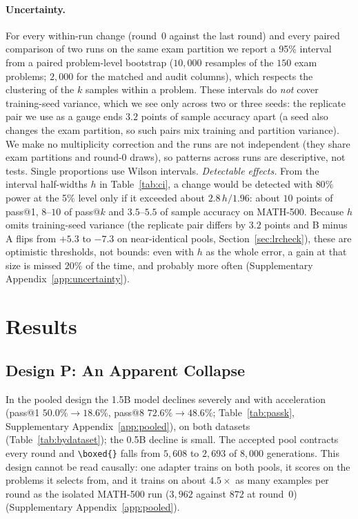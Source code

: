 \documentclass[runningheads]{llncs}
\begin{document}
\paragraph{Uncertainty.} For every within-run change (round~0 against the last
round) and every paired comparison of two runs on the same exam partition we
report a 95\% interval from a paired problem-level bootstrap ($10{,}000$
resamples of the $150$ exam problems; $2{,}000$ for the matched and audit columns), which respects the clustering of the $k$
samples within a problem. These intervals do \emph{not} cover training-seed
variance, which we see only across two or three seeds: the replicate
pair we use as a gauge ends $3.2$ points of sample accuracy apart (a seed also changes the exam
partition, so such pairs mix training and partition variance). We make no multiplicity correction and the runs are not independent (they share
exam partitions and round-0 draws), so patterns across runs are descriptive, not tests. Single proportions use Wilson
intervals. \emph{Detectable effects.} From the interval half-widths $h$ in
Table~\ref{tab:ci}, a change would be detected with $80\%$ power at the 5\%
level only if it exceeded about $2.8\,h/1.96$: about $10$ points of pass@1,
$8$--$10$ of pass@$k$ and $3.5$--$5.5$ of sample accuracy on MATH-500. Because
$h$ omits training-seed variance (the replicate pair differs by $3.2$ points and
B minus A flips from $+5.3$ to $-7.3$ on near-identical pools,
Section~\ref{sec:lrcheck}), these are optimistic thresholds, not bounds: even with $h$ as the whole error, a gain
at that size is missed $20\%$ of the time, and probably more often (Supplementary Appendix~\ref{app:uncertainty}).

\section{Results}
\label{sec:results}

\subsection{Design P: An Apparent Collapse}
\label{sec:pooled}

In the pooled design the 1.5B model declines severely and with acceleration
(pass@1 $50.0\%\to18.6\%$, pass@8 $72.6\%\to48.6\%$; Table~\ref{tab:passk}, Supplementary Appendix~\ref{app:pooled}),
on both datasets (Table~\ref{tab:bydataset}); the 0.5B decline is small. The
accepted pool contracts every round and \verb|\boxed{}| falls from $5{,}608$ to
$2{,}693$ of $8{,}000$ generations. This design cannot be read causally: one
adapter trains on both pools, it scores on the problems it selects
from, and it trains on about $4.5\times$ as many examples per round as the
isolated MATH-500 run ($3{,}962$ against $872$ at round~0) (Supplementary Appendix~\ref{app:pooled}).
\end{document}
